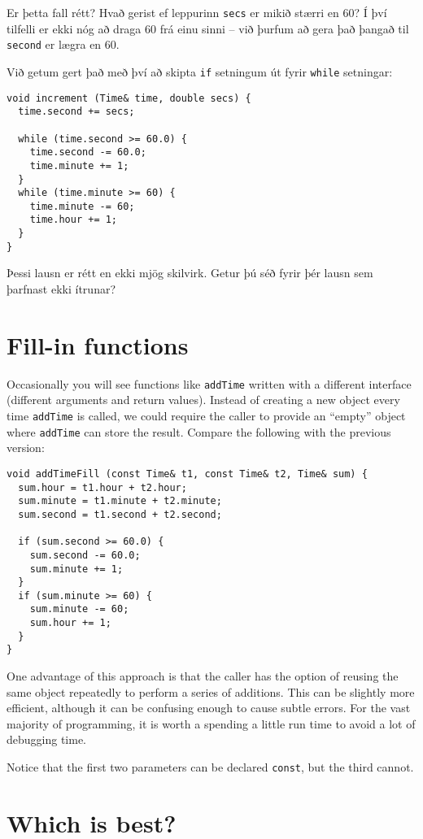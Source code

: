 Er þetta fall rétt? Hvað gerist ef leppurinn {\tt secs} er mikið stærri en 60?
Í því tilfelli er ekki nóg að draga 60 frá einu sinni -- við þurfum að gera það þangað til {\tt second} er lægra en 60.

Við getum gert það með því að skipta {\tt if} setningum út fyrir {\tt while} setningar:

\begin{verbatim}
void increment (Time& time, double secs) {
  time.second += secs;

  while (time.second >= 60.0) {
    time.second -= 60.0;
    time.minute += 1;
  }
  while (time.minute >= 60) {
    time.minute -= 60;
    time.hour += 1;
  }
}
\end{verbatim}
%
Þessi lausn er rétt en ekki mjög skilvirk.
Getur þú séð fyrir þér lausn sem þarfnast ekki ítrunar?

\section{Fill-in functions}

Occasionally you will see functions like {\tt addTime} written
with a different interface (different arguments and return values).
Instead of creating a new object every time {\tt addTime} is
called, we could require the caller to provide an ``empty''
object where {\tt addTime} can store the result.  Compare
the following with the previous version:

\begin{verbatim}
void addTimeFill (const Time& t1, const Time& t2, Time& sum) {
  sum.hour = t1.hour + t2.hour;
  sum.minute = t1.minute + t2.minute;
  sum.second = t1.second + t2.second;

  if (sum.second >= 60.0) {
    sum.second -= 60.0;
    sum.minute += 1;
  }
  if (sum.minute >= 60) {
    sum.minute -= 60;
    sum.hour += 1;
  }
}
\end{verbatim}
%
One advantage of this approach is that the caller has the option of
reusing the same object repeatedly to perform a series of additions.
This can be slightly more efficient, although it can be confusing
enough to cause subtle errors.  For the vast majority of programming,
it is worth a spending a little run time to avoid a lot of debugging
time.

Notice that the first two parameters can be declared {\tt const},
but the third cannot.

\section{Which is best?}

